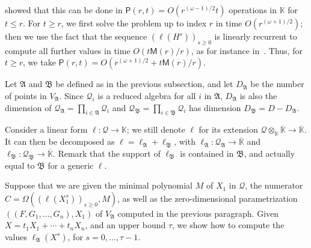 \documentclass[final,1p,times,authoryear]{elsarticle}
\newcommand{\lf}{X}
\newcommand{\residueI}{\mathscr{Q}}
\def\M {\ensuremath{\mathsf{M}}}
\def\PP {\ensuremath{\mathsf{P}}}
\def\K{\mathbb{K}}
\def\K {\ensuremath{\mathbb{K}}}
\def\Kbar {{\ensuremath{\overline{\mathbb{K}}}}}
\begin{document}
\citet[Theorem~4]{Shoup94} showed that this can be done in
$\PP(r,t)=O(r^{(\omega-1)/2} t)$ operations in $\K$ for $t \le r$. For
$t \ge r$, we first solve the problem up to index $r$ in time
$O(r^{(\omega+1)/2})$; then we use the fact that the sequence 
$(\ell(H^s))_{s \ge 0}$
is linearly recurrent to compute all further values in time
$O(t\M(r)/r)$, as for instance in~\citep[Proposition~1]{BoFlSaSc06}.
Thus, for $t \ge r$, we take $\PP(r,t)=O(r^{(\omega+1)/2} +
t\M(r)/r)$.

\medskip

Let $\mathfrak{A}$ and $\mathfrak{B}$ be defined as in the previous 
subsection, and let $D_{\mathfrak{A}}$ be the number of points in
$V_{\mathfrak{A}}$. Since $\residueI_i$ is a reduced algebra for all
$i$ in $\mathfrak{A}$, $D_\mathfrak{A}$ is also the dimension of
$\residueI_\mathfrak{A} = \prod_{i \in \mathfrak{A}}
\residueI_i$ and $\residueI_\mathfrak{B}=\prod_{i \in \mathfrak{B}}
\residueI_i$ has dimension $D_{\mathfrak{B}}=D-D_{\mathfrak{A}}$.

Consider a linear form $\ell: \residueI \to \K$; we still denote
$\ell$ for its extension $\residueI \otimes_\K \Kbar \to \Kbar$.  It
can then be decomposed as $\ell= \ell_{\mathfrak{A}} +
\ell_{\mathfrak{B}}$, with $\ell_\mathfrak{A}: \residueI_\mathfrak{A}
\to \Kbar$ and $\ell_\mathfrak{B}: \residueI_\mathfrak{B} \to \Kbar$.
Remark that the support of $\ell_\mathfrak{B}$ is contained in
$\mathfrak{B}$, and actually equal to $\mathfrak{B}$ for a generic
$\ell$.

Suppose that we are given the minimal polynomial $M$ of $X_1$ in
$\residueI$, the numerator $C=\Omega( (\ell(X_1^s))_{s \ge 0}, M)$, as
well as the zero-dimensional parametrization $((F,G_1,\dots,G_n),X_1)$
of $V_\mathfrak{A}$ computed in the previous paragraph.  Given
$\lf=t_1 X_1 + \cdots+ t_n X_n$, and an upper bound $\tau$, we show
how to compute the values $\ell_\mathfrak{A}(\lf^s)$, for
$s=0,\dots,\tau-1$.
\end{document}
